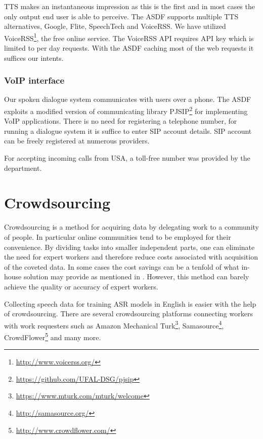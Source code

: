 \acf{TTS} makes an instantaneous impression as this is the first and in most cases the only output end user is able to perceive. %
The \ac{ASDF} 
supports multiple \ac{TTS} alternatives, Google, Flite, SpeechTech and VoiceRSS.
We have utilized VoiceRSS\footnote{\url{http://www.voicerss.org/}}, the free online service.
The VoiceRSS \ac{API} requires \ac{API} key which is limited to per day requests.
With the \ac{ASDF} 
caching most of the web requests it suffices our intents.

\subsubsection{VoIP interface}

Our spoken dialogue system communicates with users over a phone.
The \ac{ASDF} 
exploits a modified version of communicating library PJSIP\footnote{\url{https://github.com/UFAL-DSG/pjsip}} for implementing VoIP applications.
There is no need for registering a telephone number, for running a dialogue system it is suffice to enter \ac{SIP} account details.
\ac{SIP} account can be freely registered at numerous providers.

For accepting incoming calls from USA, a toll-free number was provided by the department.

\section{Crowdsourcing}

Crowdsourcing is a method for acquiring data by delegating work to a community of people.
In particular online communities tend to be employed for their convenience.
By dividing tasks into smaller independent parts, one can eliminate the need for expert workers and therefore reduce costs associated with acquisition of the coveted data.
In some cases the cost savings can be a tenfold of what in-house solution may provide as mentioned in \cite{mturk}. %
However, this method can barely achieve the quality or accuracy of expert workers.

Collecting speech data for training \ac{ASR} models in English is easier with the help of crowdsourcing.
There are several crowdsourcing platforms connecting workers with work requesters such as
Amazon Mechanical Turk\footnote{\url{https://www.mturk.com/mturk/welcome}},
Samasource\footnote{\url{http://samasource.org/}},
CrowdFlower\footnote{\url{http://www.crowdflower.com/}}
and many more.

